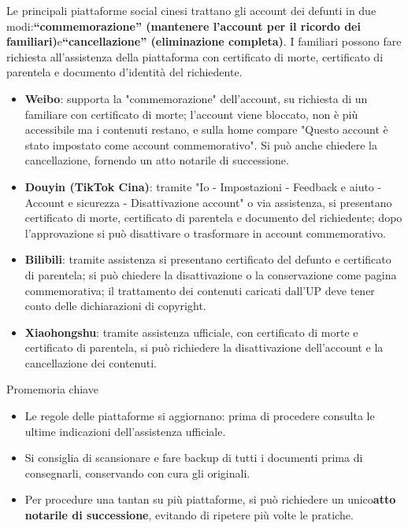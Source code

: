 Le principali piattaforme social cinesi trattano gli account dei defunti in due modi:\textbf{“commemorazione” (mantenere l'account per il ricordo dei familiari)}e\textbf{“cancellazione” (eliminazione completa)}. I familiari possono fare richiesta all'assistenza della piattaforma con certificato di morte, certificato di parentela e documento d'identità del richiedente.

\begin{itemize}
  \item \textbf{Weibo}: supporta la "commemorazione" dell'account, su richiesta di un familiare con certificato di morte; l'account viene bloccato, non è più accessibile ma i contenuti restano, e sulla home compare "Questo account è stato impostato come account commemorativo". Si può anche chiedere la cancellazione, fornendo un atto notarile di successione.
  \item \textbf{Douyin (TikTok Cina)}: tramite "Io - Impostazioni - Feedback e aiuto - Account e sicurezza - Disattivazione account" o via assistenza, si presentano certificato di morte, certificato di parentela e documento del richiedente; dopo l'approvazione si può disattivare o trasformare in account commemorativo.
  \item \textbf{Bilibili}: tramite assistenza si presentano certificato del defunto e certificato di parentela; si può chiedere la disattivazione o la conservazione come pagina commemorativa; il trattamento dei contenuti caricati dall'UP deve tener conto delle dichiarazioni di copyright.
  \item \textbf{Xiaohongshu}: tramite assistenza ufficiale, con certificato di morte e certificato di parentela, si può richiedere la disattivazione dell'account e la cancellazione dei contenuti.
\end{itemize}

\begin{tcbinfo}{Promemoria chiave}
\begin{itemize}
  \item Le regole delle piattaforme si aggiornano: prima di procedere consulta le ultime indicazioni dell'assistenza ufficiale.
  \item Si consiglia di scansionare e fare backup di tutti i documenti prima di consegnarli, conservando con cura gli originali.
  \item Per procedure una tantan su più piattaforme, si può richiedere un unico\textbf{atto notarile di successione}, evitando di ripetere più volte le pratiche.
\end{itemize}

\end{tcbinfo}

